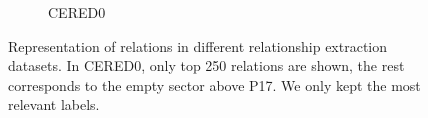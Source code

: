 \begin{figure}[h]
\begin{subfigure}[t]{.5\textwidth}
\begin{tikzpicture}
\end{tikzpicture}
  \caption{CERED0}
  \label{fig:kolaceCered0}
\end{subfigure}
\caption{Representation of relations in different relationship extraction datasets. In CERED0, only top 250 relations are shown, the rest corresponds to the empty sector above P17. We only kept the most relevant labels.}
\label{fig:kolace}
\end{figure}


